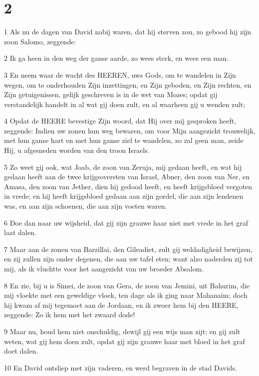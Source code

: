 \chapter{2}

\par 1 Als nu de dagen van David nabij waren, dat hij sterven zou, zo gebood hij zijn zoon Salomo, zeggende:
\par 2 Ik ga heen in den weg der ganse aarde, zo wees sterk, en wees een man.
\par 3 En neem waar de wacht des HEEREN, uws Gods, om te wandelen in Zijn wegen, om te onderhouden Zijn inzettingen, en Zijn geboden, en Zijn rechten, en Zijn getuigenissen, gelijk geschreven is in de wet van Mozes; opdat gij verstandelijk handelt in al wat gij doen zult, en al waarheen gij u wenden zult;
\par 4 Opdat de HEERE bevestige Zijn woord, dat Hij over mij gesproken heeft, zeggende: Indien uw zonen hun weg bewaren, om voor Mijn aangezicht trouwelijk, met hun ganse hart en met hun ganse ziel te wandelen, zo zal geen man, zeide Hij, u afgesneden worden van den troon Israels.
\par 5 Zo weet gij ook, wat Joab, de zoon van Zeruja, mij gedaan heeft, en wat hij gedaan heeft aan de twee krijgsoversten van Israel, Abner, den zoon van Ner, en Amasa, den zoon van Jether, dien hij gedood heeft, en heeft krijgsbloed vergoten in vrede; en hij heeft krijgsbloed gedaan aan zijn gordel, die aan zijn lendenen was, en aan zijn schoenen, die aan zijn voeten waren.
\par 6 Doe dan naar uw wijsheid, dat gij zijn grauwe haar niet met vrede in het graf laat dalen.
\par 7 Maar aan de zonen van Barzillai, den Gileadiet, zult gij weldadigheid bewijzen, en zij zullen zijn onder degenen, die aan uw tafel eten; want alzo naderden zij tot mij, als ik vluchtte voor het aangezicht van uw broeder Absalom.
\par 8 En zie, bij u is Simei, de zoon van Gera, de zoon van Jemini, uit Bahurim, die mij vloekte met een geweldige vloek, ten dage als ik ging naar Mahanaim; doch hij kwam af mij tegemoet aan de Jordaan, en ik zwoer hem bij den HEERE, zeggende: Zo ik hem met het zwaard dode!
\par 9 Maar nu, houd hem niet onschuldig, dewijl gij een wijs man zijt; en gij zult weten, wat gij hem doen zult, opdat gij zijn grauwe haar met bloed in het graf doet dalen.
\par 10 En David ontsliep met zijn vaderen, en werd begraven in de stad Davids.
